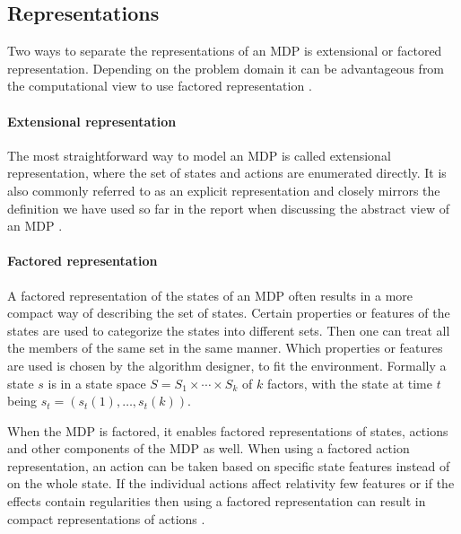 \subsection{Representations}

Two ways to separate the representations of an MDP is extensional or factored
representation. Depending on the problem domain it can be advantageous from the
computational view to use factored representation
\parencite{dean1999descision}.

\paragraph{Extensional representation}

The most straightforward way to model an MDP is called extensional
representation, where the set of states and actions are enumerated directly. It
is also commonly referred to as an explicit representation and closely mirrors
the definition we have used so far in the report when discussing the abstract
view of an MDP \parencite{dean1999descision}.

\paragraph{Factored representation} 
\label{sec:factored_mdp}

A factored representation of the states of an MDP often results in a more
compact way of describing the set of states.  Certain properties or features of
the states are used to categorize the states into different sets. Then one can
treat all the members of the same set in the same manner. Which properties or
features are used is chosen by the algorithm designer, to fit the environment.
Formally a state $s$ is in a state space $S = S_1 \times \cdots \times S_k$
of $k$ factors, with the state at time $t$ being $s_t = (s_t(1), \ldots,
s_t(k))$.


When the MDP is factored, it enables factored representations of states,
actions and other components of the MDP as well. When using a factored action
representation, an action can be taken based on specific state features instead
of on the whole state. If the individual actions affect relativity few features
or if the effects contain regularities then using a factored representation can
result in compact representations of actions \parencite{dean1999descision}. 
